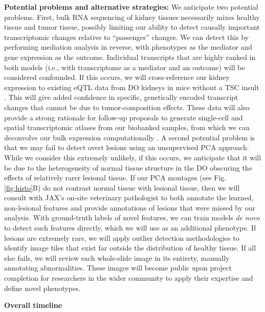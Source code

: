 \documentclass[
  12pt,
]{article}
\begin{document}
\pagebreak

\textbf{Potential problems and alternative strategies:} We anticipate
two potential problems. First, bulk RNA sequencing of kidney tissues
necessarily mixes healthy tissue and tumor tissue, possibly limiting our
ability to detect causally important transcriptomic changes relative to
``passenger'' changes. We can detect this by performing mediation
analysis in reverse, with phenotypes as the mediator and gene expression
as the outcome. Individual transcripts that are highly ranked in both
models (i.e., with transcriptome as a mediator and an outcome) will be
considered confounded. If this occurs, we will cross-reference our
kidney expression to existing eQTL data from DO kidneys in mice without
a TSC insult \cite{33687326}. This will give added confidence in
specific, genetically encoded transcript changes that cannot be due to
tumor-composition effects. These data will also provide a strong
rationale for follow-up proposals to generate single-cell and spatial
transcriptomic atlases from our biobanked samples, from which we can
deconvolve our bulk expression computationally \cite{30670690}. A second
potential problem is that we may fail to detect overt lesions using an
unsupervised PCA approach. While we consider this extremely unlikely, if
this occurs, we anticipate that it will be due to the heterogeneity of
normal tissue structure in the DO obscuring the effects of relatively
rarer lesional tissue. If our PCA montages (see Fig. \ref{fig:histo}B)
do not contrast normal tissue with lesional tissue, then we will consult
with JAX's on-site veterinary pathologist to both annotate the learned,
non-lesional features and provide annotations of lesions that were
missed by our analysis. With ground-truth labels of novel features, we
can train models \textit{de novo} to detect such features directly,
which we will use as an additional phenotype. If lesions are extremely
rare, we will apply outlier detection methodologies
\cite{crammer_needle_2004} to identify image tiles that exist far
outside the distribution of healthy tissue. If all else fails, we will
review each whole-slide image in its entirety, manually annotating
abnormalities. These images will become public upon project completion
for researchers in the wider community to apply their expertise and
define novel phenotypes.

\pagebreak

\textbf{Overall timeline}
\end{document}
